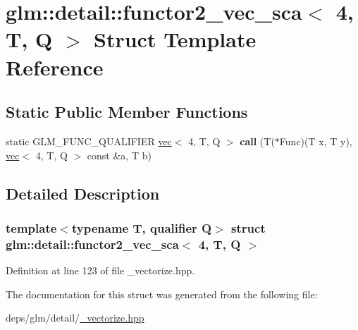\hypertarget{structglm_1_1detail_1_1functor2__vec__sca_3_014_00_01T_00_01Q_01_4}{}\section{glm\+:\+:detail\+:\+:functor2\+\_\+vec\+\_\+sca$<$ 4, T, Q $>$ Struct Template Reference}
\label{structglm_1_1detail_1_1functor2__vec__sca_3_014_00_01T_00_01Q_01_4}
\subsection*{Static Public Member Functions}
\begin{DoxyCompactItemize}
\item 
\mbox{\label{structglm_1_1detail_1_1functor2__vec__sca_3_014_00_01T_00_01Q_01_4_aecb3a0b7b9bc4c0664db8d1b4f9a93ea}} 
static G\+L\+M\+\_\+\+F\+U\+N\+C\+\_\+\+Q\+U\+A\+L\+I\+F\+I\+ER \hyperlink{structglm_1_1vec}{vec}$<$ 4, T, Q $>$ {\bfseries call} (T($\ast$Func)(T x, T y), \hyperlink{structglm_1_1vec}{vec}$<$ 4, T, Q $>$ const \&a, T b)
\end{DoxyCompactItemize}


\subsection{Detailed Description}
\subsubsection*{template$<$typename T, qualifier Q$>$\newline
struct glm\+::detail\+::functor2\+\_\+vec\+\_\+sca$<$ 4, T, Q $>$}



Definition at line 123 of file \+\_\+vectorize.\+hpp.



The documentation for this struct was generated from the following file\+:\begin{DoxyCompactItemize}
\item 
deps/glm/detail/\hyperlink{__vectorize_8hpp}{\+\_\+vectorize.\+hpp}\end{DoxyCompactItemize}
